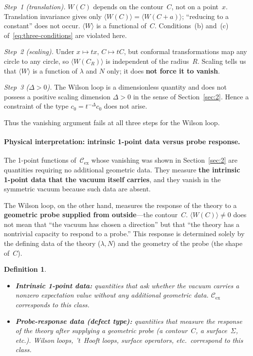 \documentclass[
  aps,
  prd,
  preprint,
  groupedaddress,
  nofootinbib,
  longbibliography
]{revtex4-2}
\newtheorem{definition}{Definition}[section]
\theoremstyle{remark}
\newcommand{\Cex}{\mathcal{C}_{\mathrm{ex}}}
\begin{document}
\emph{Step~1 (translation).}
$W(C)$ depends on the contour~$C$, not on a point~$x$.
Translation invariance gives only
$\langle W(C)\rangle = \langle W(C+a)\rangle$;
``reducing to a constant'' does not occur.
$\langle W\rangle$ is a functional of~$C$.
Conditions~(b) and~(c) of~\eqref{eq:three-conditions} are
violated here.

\emph{Step~2 (scaling).}
Under $x\mapsto tx$, $C\mapsto tC$, but conformal
transformations map any circle to any circle, so
$\langle W(C_R)\rangle$ is independent of the radius~$R$.
Scaling tells us that $\langle W\rangle$ is a function of
$\lambda$ and $N$ only; it does \textbf{not force it to vanish}.

\emph{Step~3 ($\Delta>0$).}
The Wilson loop is a dimensionless quantity and does not possess a
positive scaling dimension $\Delta>0$ in the sense of
Section~\ref{sec:2}.
Hence a constraint of the type
$c_0=t^{-\Delta}c_0$ does not arise.

Thus the vanishing argument fails at all three steps for the
Wilson loop.

\paragraph{Physical interpretation: intrinsic 1-point data
  versus probe response.}
The 1-point functions of~$\Cex$ whose vanishing was shown in
Section~\ref{sec:2} are quantities requiring no additional
geometric data.
They measure \textbf{the intrinsic 1-point data that the vacuum
itself carries}, and they vanish in the symmetric vacuum because
such data are absent.

The Wilson loop, on the other hand, measures the response of
the theory to a \textbf{geometric probe supplied from outside}---the
contour~$C$.
$\langle W(C)\rangle\neq 0$ does not mean that
``the vacuum has chosen a direction'' but that ``the theory has
a nontrivial capacity to respond to a probe.''
This response is determined solely by the defining data of the
theory ($\lambda,N$) and the geometry of the probe (the shape
of~$C$).

\begin{definition}\label{def:intrinsic-vs-probe}
\begin{itemize}
\item \textbf{Intrinsic 1-point data:} quantities that ask
  whether the vacuum carries a nonzero expectation value without
  any additional geometric data.
  $\Cex$ corresponds to this class.
\item \textbf{Probe-response data (defect type):} quantities
  that measure the response of the theory after supplying a
  geometric probe (a contour~$C$, a surface~$\Sigma$, etc.).
  Wilson loops, 't~Hooft loops, surface operators, etc.\
  correspond to this class.
\end{itemize}
\end{definition}
\end{document}
